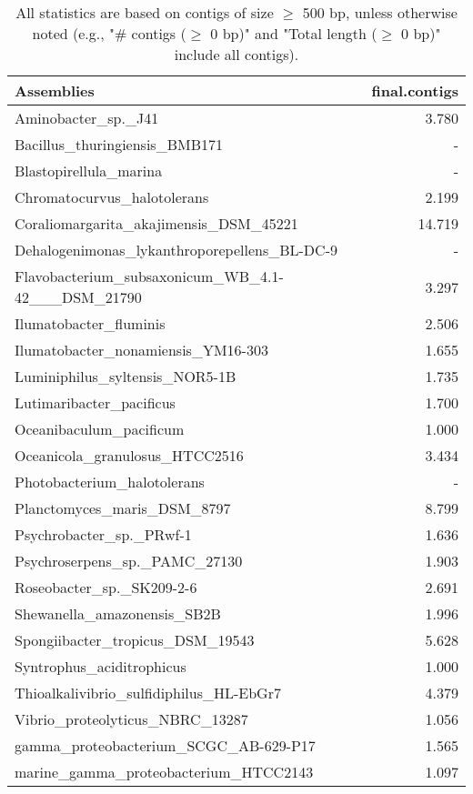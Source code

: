 \documentclass[12pt,a4paper]{article}
\begin{document}
\begin{table}[ht]
\begin{center}
\caption{All statistics are based on contigs of size $\geq$ 500 bp, unless otherwise noted (e.g., "\# contigs ($\geq$ 0 bp)" and "Total length ($\geq$ 0 bp)" include all contigs).}
\begin{tabular}{|l*{1}{|r}|}
\hline
Assemblies & final.contigs \\ \hline
Aminobacter\_sp.\_J41 & 3.780 \\ \hline
Bacillus\_thuringiensis\_BMB171 & - \\ \hline
Blastopirellula\_marina & - \\ \hline
Chromatocurvus\_halotolerans & 2.199 \\ \hline
Coraliomargarita\_akajimensis\_DSM\_45221 & 14.719 \\ \hline
Dehalogenimonas\_lykanthroporepellens\_BL-DC-9 & - \\ \hline
Flavobacterium\_subsaxonicum\_WB\_4.1-42\_\_\_DSM\_21790 & 3.297 \\ \hline
Ilumatobacter\_fluminis & 2.506 \\ \hline
Ilumatobacter\_nonamiensis\_YM16-303 & 1.655 \\ \hline
Luminiphilus\_syltensis\_NOR5-1B & 1.735 \\ \hline
Lutimaribacter\_pacificus & 1.700 \\ \hline
Oceanibaculum\_pacificum & 1.000 \\ \hline
Oceanicola\_granulosus\_HTCC2516 & 3.434 \\ \hline
Photobacterium\_halotolerans & - \\ \hline
Planctomyces\_maris\_DSM\_8797 & 8.799 \\ \hline
Psychrobacter\_sp.\_PRwf-1 & 1.636 \\ \hline
Psychroserpens\_sp.\_PAMC\_27130 & 1.903 \\ \hline
Roseobacter\_sp.\_SK209-2-6 & 2.691 \\ \hline
Shewanella\_amazonensis\_SB2B & 1.996 \\ \hline
Spongiibacter\_tropicus\_DSM\_19543 & 5.628 \\ \hline
Syntrophus\_aciditrophicus & 1.000 \\ \hline
Thioalkalivibrio\_sulfidiphilus\_HL-EbGr7 & 4.379 \\ \hline
Vibrio\_proteolyticus\_NBRC\_13287 & 1.056 \\ \hline
gamma\_proteobacterium\_SCGC\_AB-629-P17 & 1.565 \\ \hline
marine\_gamma\_proteobacterium\_HTCC2143 & 1.097 \\ \hline
\end{tabular}
\end{center}
\end{table}
\end{document}
